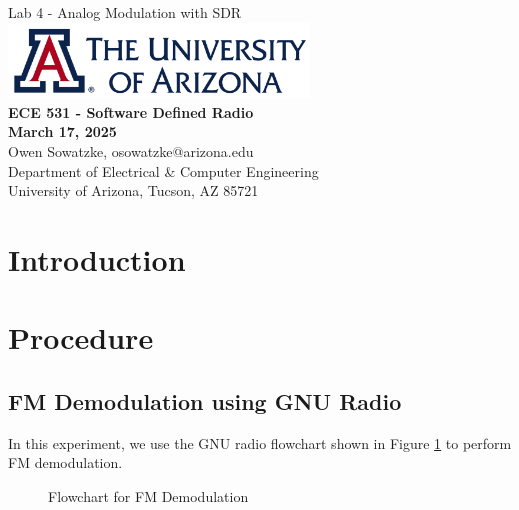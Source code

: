 \documentclass{article}
\begin{document}
\begin{titlepage}
	\centering
	{\huge Lab 4 - Analog Modulation with SDR}\\[0.25 in]
	\includegraphics[width=0.6\textwidth]{ua_logo.png}\\[0.25 in]
	{\large \textbf{ECE 531 - Software Defined Radio\\[0.25 in]
	March 17, 2025\\[0.25 in]}}
	{\large Owen Sowatzke, osowatzke@arizona.edu\\[0.05 in]
	Department of Electrical \& Computer Engineering\\[0.05 in]
	University of Arizona, Tucson, AZ 85721\\[0.5 in]}
	\hypersetup{linkcolor=navy-blue}
	\noindent\hrulefill
	\tableofcontents
	\noindent\hrulefill
\end{titlepage}

\setlength{\parindent}{0pt}

\section{Introduction}

\section{Procedure}

\subsection{FM Demodulation using GNU Radio}
\label{section::fm_demod_gnu_radio}

In this experiment, we use the GNU radio flowchart shown in Figure \ref{fig::fm_radio_flowchart} to perform FM demodulation.

\begin{figure}[H]
	\centerline{}
	\caption{Flowchart for FM Demodulation}
	\label{fig::fm_radio_flowchart}
\end{figure}
\end{document}
